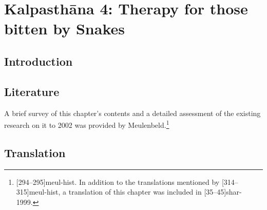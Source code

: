 \chapter{Kalpasthāna 4: Therapy for those bitten by Snakes}

\section{Introduction} 

\section{Literature}

A brief survey of this chapter's contents and a detailed assessment of
the existing research on it to 2002 was provided by
Meulenbeld.\footnote{[294--295]{meul-hist}. In addition to the
    translations mentioned by [314--315]{meul-hist}, a translation
    of this chapter was included in [35--45]{shar-1999}.} 
    
\section{Translation}

\begin{translation}
    \item [1]
    
    
\end{translation}    